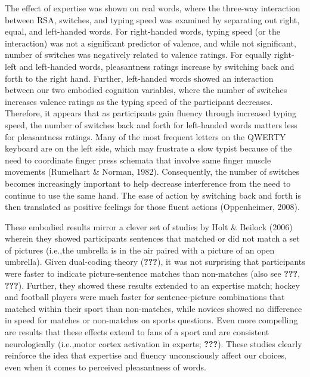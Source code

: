 \documentclass[english,man]{apa6}
\theoremstyle{definition}
\theoremstyle{definition}
\theoremstyle{definition}
\theoremstyle{remark}
\begin{document}
The effect of expertise was shown on real words, where the three-way
interaction between RSA, switches, and typing speed was examined by
separating out right, equal, and left-handed words. For right-handed
words, typing speed (or the interaction) was not a significant predictor
of valence, and while not significant, number of switches was negatively
related to valence ratings. For equally right-left and left-handed
words, pleasantness ratings increase by switching back and forth to the
right hand. Further, left-handed words showed an interaction between our
two embodied cognition variables, where the number of switches increases
valence ratings as the typing speed of the participant decreases.
Therefore, it appears that as participants gain fluency through
increased typing speed, the number of switches back and forth for
left-handed words matters less for pleasantness ratings. Many of the
most frequent letters on the QWERTY keyboard are on the left side, which
may frustrate a slow typist because of the need to coordinate finger
press schemata that involve same finger muscle movements (Rumelhart \&
Norman, 1982). Consequently, the number of switches becomes increasingly
important to help decrease interference from the need to continue to use
the same hand. The ease of action by switching back and forth is then
translated as positive feelings for those fluent actions (Oppenheimer,
2008).

These embodied results mirror a clever set of studies by Holt \& Beilock
(2006) wherein they showed participants sentences that matched or did
not match a set of pictures (i.e.,the umbrella is in the air paired with
a picture of an open umbrella). Given dual-coding theory
({\textbf{???}}), it was not surprising that participants were faster to
indicate picture-sentence matches than non-matches (also see
{\textbf{???}}, {\textbf{???}}). Further, they showed these results
extended to an expertise match; hockey and football players were much
faster for sentence-picture combinations that matched within their sport
than non-matches, while novices showed no difference in speed for
matches or non-matches on sports questions. Even more compelling are
results that these effects extend to fans of a sport and are consistent
neurologically (i.e.,motor cortex activation in experts;
{\textbf{???}}). These studies clearly reinforce the idea that expertise
and fluency unconsciously affect our choices, even when it comes to
perceived pleasantness of words.
\end{document}
